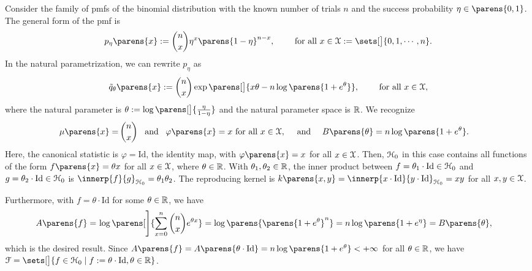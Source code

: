 \begin{example}
	Consider the family of pmfs of the binomial distribution with the known number of trials $n$ and the success probability $\eta \in \parens{0, 1}$. The general form of the pmf is 
	\begin{align*}
		p_{\eta} \parens{x} := {n \choose x} \eta^x \parens{1 - \eta}^{n-x}, \qquad \text{ for all } x \in \calX := \sets[\big]{0, 1, \cdots, n}. 
	\end{align*}		
	In the natural parametrization, we can rewrite $p_{\eta}$ as 
	\begin{align*}
		\tilde{q}_{\theta} \parens{x} := {n \choose x} \exp \parens[\big]{x \theta - n \log \parens{1 + e^\theta}}, \qquad \text{ for all } x \in \calX, 
	\end{align*}
	where the natural parameter is $\theta := \log \parens[\big]{\frac{\eta}{1-\eta}}$ and the natural parameter space is $\mathbb{R}$. We recognize 
	\begin{align*}
		\mu \parens{x} = & \, {n \choose x} \enspace \text{ and } \enspace \varphi \parens{x} = x \text{ for all } x \in \calX, \quad \text{ and } \quad 
		B \parens{\theta} = n \log \parens{1 + e^\theta}. 
	\end{align*}
	Here, the canonical statistic is $\varphi = \mathrm{Id}$, the identity map, with $\varphi \parens{x} = x$ for all $x \in \mathcal{X}$. Then, $\mathcal{H}_0$ in this case contains all functions of the form $f \parens{x} = \theta x$ for all $x \in \mathcal{X}$, where $\theta \in \mathbb{R}$. With $\theta_1, \theta_2 \in \mathbb{R}$, the inner product between $f = \theta_1 \cdot \mathrm{Id} \in \mathcal{H}_0$ and $g = \theta_2 \cdot \mathrm{Id} \in \mathcal{H}_0$ is $\innerp{f}{g}_{\calH_0} = \theta_1 \theta_2$. The reproducing kernel is $k \parens{x, y} = \innerp{x \cdot \mathrm{Id}}{y \cdot \mathrm{Id} }_{\hil_0} = x y$ for all $x, y \in \mathcal{X}$. 
	
	Furthermore, with $f = \theta \cdot \mathrm{Id}$ for some $\theta \in \mathbb{R}$, we have 
	\begin{align*}
		A \parens{f} = & \, %
		\log \parens[\Bigg]{\sum_{x=0}^n {n \choose x} e^{\theta x}} 
		= \log \parens{\parens{1+e^{\theta}}^n} 
		= n \log \parens{1+e^{\eta}} = B \parens{\theta}, 
	\end{align*}
	which is the desired result. Since $A \parens{f} = A \parens{\theta \cdot \mathrm{Id} } = n \log \parens{1 + e^{\theta}} < + \infty$ for all $\theta \in \mathbb{R}$, we have $\calF = \sets[\big]{f \in \calH_0 \mid f := \theta \cdot \mathrm{Id}, \theta \in \Real}$. 
\end{example}

